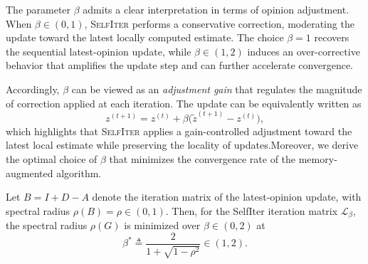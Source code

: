 \documentclass[sigconf,review, nonacm]{acmart}
\newcommand\zz{\boldsymbol{\mathit{z}}}
\renewcommand\AA{\boldsymbol{\mathit{A}}}
\newcommand\BB{\boldsymbol{\mathit{B}}}
\newcommand\DD{\boldsymbol{\mathit{D}}}
\newcommand\II{\boldsymbol{\mathit{I}}}
\newcommand\GG{\boldsymbol{\mathit{G}}}
\begin{document}
The parameter $\beta$ admits a clear interpretation in terms of opinion adjustment.
When $\beta \in (0,1)$, \textsc{SelfIter} performs a conservative correction,
moderating the update toward the latest locally computed estimate.
The choice $\beta = 1$ recovers the sequential latest-opinion update,
while $\beta \in (1,2)$ induces an over-corrective behavior that amplifies the update step
and can further accelerate convergence.

Accordingly, $\beta$ can be viewed as an \emph{adjustment gain} that regulates
the magnitude of correction applied at each iteration.
The update can be equivalently written as
\[
\zz^{(t+1)} = \zz^{(t)} + \beta\bigl(\tilde{\zz}^{(t+1)} - \zz^{(t)}\bigr),
\]
which highlights that \textsc{SelfIter} applies a gain-controlled adjustment
toward the latest local estimate while preserving the locality of updates.Moreover, we derive the optimal choice of $\beta$ that minimizes the convergence rate of the memory-augmented algorithm.




\begin{lemma}
	\label{lem:opt}
	Let $\BB=\II+\DD-\AA$ denote the iteration matrix of the latest-opinion update, with spectral radius
	$\rho(\BB)=\rho\in(0,1)$. 
	Then, for the SelfIter iteration matrix $\mathcal{L}_\beta$,
	the spectral radius $\rho(\GG)$ is minimized over $\beta\in(0,2)$ at
	\[
	\beta^* \triangleq \frac{2}{1+\sqrt{1-\rho^2}} \in (1,2).
	\]
\end{lemma}
\end{document}
